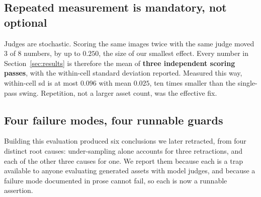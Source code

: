 \documentclass{article}
\begin{document}
\subsection{Repeated measurement is mandatory, not optional}

Judges are stochastic. Scoring the same images twice with the same judge moved 3 of 8 numbers, by up
to $0.250$, the size of our smallest effect. Every number in Section~\ref{sec:results} is therefore
the mean of \textbf{three independent scoring passes}, with the within-cell standard deviation
reported. Measured this way, within-cell sd is at most $0.096$ with mean $0.025$, ten times smaller
than the single-pass swing. Repetition, not a larger asset count, was the effective fix.

\subsection{Four failure modes, four runnable guards}

Building this evaluation produced six conclusions we later retracted, from four distinct root
causes: under-sampling alone accounts for three retractions, and each of the other three causes for
one. We report them because each is a trap available to anyone evaluating generated assets with
model judges, and because a failure mode documented in prose cannot fail, so each is now a runnable
assertion.
\end{document}
